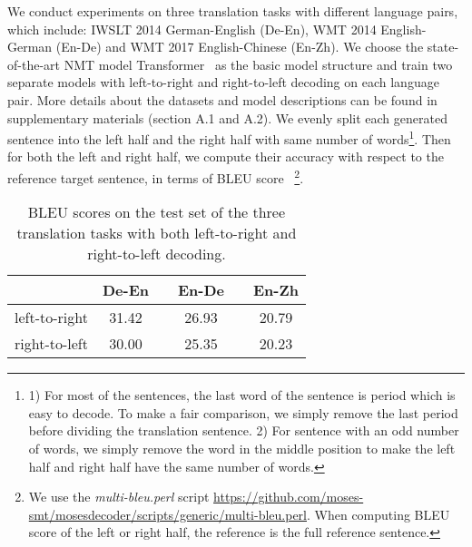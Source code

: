 \documentclass[11pt,a4paper]{article}
\begin{document}
We conduct experiments on three translation tasks with different language pairs, which include: IWSLT 2014 German-English (De-En), WMT 2014 English-German (En-De) and WMT 2017 English-Chinese (En-Zh). We choose the state-of-the-art NMT model Transformer~\cite{DBLP:conf/nips/VaswaniSPUJGKP17} as the basic model structure and train two separate models with left-to-right and right-to-left decoding on each language pair. More details about the datasets and model descriptions can be found in supplementary materials (section A.1 and A.2). We evenly split each generated sentence into the left half and the right half with same number of words\footnote{1) For most of the sentences, the last word of the sentence is period which is easy to decode. To make a fair comparison, we simply remove the last period before dividing the translation sentence. 2) For sentence with an odd number of words, we simply remove the word in the middle position to make the left half and right half have the same number of words.}. Then for both the left and right half, we compute their accuracy with respect to the reference target sentence, in terms of BLEU score~\cite{DBLP:conf/acl/PapineniRWZ02} \footnote{We use the \emph{multi-bleu.perl} script \url{https://github.com/moses-smt/mosesdecoder/scripts/generic/multi-bleu.perl}. When computing BLEU score of the left or right half, the reference is the full reference sentence.}.


\begin{table}[!tbp]
\small
\centering %
\begin{tabular}{ l  c  c  c  c  c} %
\toprule
& De-En & & En-De & & En-Zh   \\
\midrule
left-to-right & 31.42 & & 26.93 & & 20.79  \\
right-to-left & 30.00 & & 25.35 & & 20.23  \\
\bottomrule
\end{tabular}
\caption{BLEU scores on the test set of the three translation tasks with both left-to-right and right-to-left decoding.}
\label{no_feed_full}
\end{table}
\end{document}

